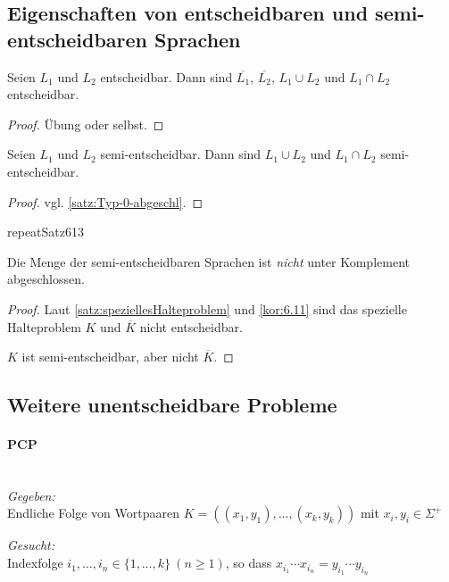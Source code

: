 {\subsection{Eigenschaften von entscheidbaren und semi-entscheidbaren Sprachen}
\begin{Satz}[name={[Eigenschaften von Entscheidbarkeit]}]
\label{thm:eigensch-von-entsch}
  Seien $L_1$ und $L_2$ entscheidbar. Dann sind $\overline{L_1}$, $\overline{L_2}$, $L_1 \cup L_2$ und $L_1 \cap L_2$ entscheidbar.
\end{Satz}\vspace{-1.5em}
\begin{proof}
  Übung oder selbst.
\end{proof}
\begin{Satz}[name={[Eigenschaften von Semi-Entscheidbarkeit]}]
  Seien $L_1$ und $L_2$ semi-entscheidbar. Dann sind $L_1 \cup L_2$ und $L_1 \cap L_2$ semi-entscheidbar.
\end{Satz}
\begin{proof}
  vgl. \autoref{satz:Typ-0-abgeschl}.
\end{proof}
\csname repeatSatz613\endcsname*
\begin{Satz}
  Die Menge der semi-entscheidbaren Sprachen ist \emph{nicht}
  unter Komplement abgeschlossen.
\end{Satz}
\begin{proof}
  Laut \autoref{satz:speziellesHalteproblem} und \autoref{kor:6.11} sind das spezielle Halteproblem $K$ und $\overline{K}$ nicht entscheidbar.
  
  $K$ ist semi-entscheidbar, aber nicht $\overline{K}$.
\end{proof}


\subsection{Weitere unentscheidbare Probleme}
\paragraph[\acf*{PCP}]{\acf{PCP}}\ \\
\emph{Gegeben:}\\
Endliche Folge von Wortpaaren $K=((x_1, y_1), \dots, (x_k, y_k))$ mit $x_i, y_i \in \Sigma^+$

\emph{Gesucht:}\\
Indexfolge $i_1, \dots, i_n \in \{1, \dots, k\}\ (n \geq 1)$, so dass $x_{i_1} \cdots x_{i_n}=y_{i_1} \cdots y_{i_n}$

}
